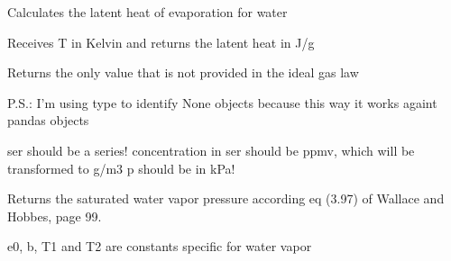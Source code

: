 \documentclass[a4paper,10pt,english]{sphinxmanual}
\begin{document}

\begin{fulllineitems}
\label{pymicra:pymicra.physics.latent_heat_water}
Calculates the latent heat of evaporation for water

Receives T in Kelvin and returns the latent heat in J/g

\end{fulllineitems}


\begin{fulllineitems}
\label{pymicra:pymicra.physics.perfGas}
Returns the only value that is not provided in the ideal gas law

P.S.: I'm using type to identify None objects because this way it works
againt pandas objects

\end{fulllineitems}


\begin{fulllineitems}
\label{pymicra:pymicra.physics.ppxv2density}
ser should be a series!
concentration in ser should be ppmv, which will be transformed to g/m3
p should be in kPa!

\end{fulllineitems}


\begin{fulllineitems}
\label{pymicra:pymicra.physics.satWaterPressure}
Returns the saturated water vapor pressure according eq (3.97) of Wallace and Hobbes, page 99.

e0, b, T1 and T2 are constants specific for water vapor

\end{fulllineitems}
\end{document}

